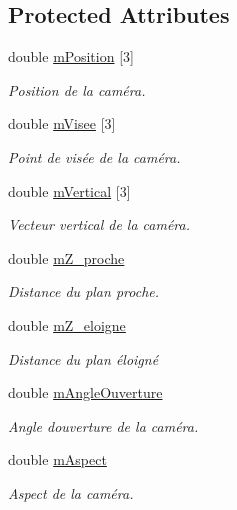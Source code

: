 \subsection*{Protected Attributes}
\begin{DoxyCompactItemize}
\item 
double \hyperlink{class_abstract_camera_aacd5e7f2d881e719f254a1d6e2904b91}{m\+Position} \mbox{[}3\mbox{]}
\begin{DoxyCompactList}\small\item\em Position de la caméra. \end{DoxyCompactList}\item 
double \hyperlink{class_abstract_camera_a5c7db642de2add50fad69539a8b220d8}{m\+Visee} \mbox{[}3\mbox{]}
\begin{DoxyCompactList}\small\item\em Point de visée de la caméra. \end{DoxyCompactList}\item 
double \hyperlink{class_abstract_camera_a64675d12169d6383a9371d7fd710a441}{m\+Vertical} \mbox{[}3\mbox{]}
\begin{DoxyCompactList}\small\item\em Vecteur vertical de la caméra. \end{DoxyCompactList}\item 
double \hyperlink{class_abstract_camera_a408e219c2aed42b6aa4f9198c252d10a}{m\+Z\+\_\+proche}
\begin{DoxyCompactList}\small\item\em Distance du plan proche. \end{DoxyCompactList}\item 
double \hyperlink{class_abstract_camera_a8e076553a55c8e2f19948bdf4ea01be1}{m\+Z\+\_\+eloigne}
\begin{DoxyCompactList}\small\item\em Distance du plan éloigné \end{DoxyCompactList}\item 
double \hyperlink{class_abstract_camera_a5facdc9b6a67be951f8adea9d7ed8756}{m\+Angle\+Ouverture}
\begin{DoxyCompactList}\small\item\em Angle d\textquotesingle{}ouverture de la caméra. \end{DoxyCompactList}\item 
double \hyperlink{class_abstract_camera_a84ea352c679449eeef49d92274bfc9e0}{m\+Aspect}
\begin{DoxyCompactList}\small\item\em Aspect de la caméra. \end{DoxyCompactList}\end{DoxyCompactItemize}


